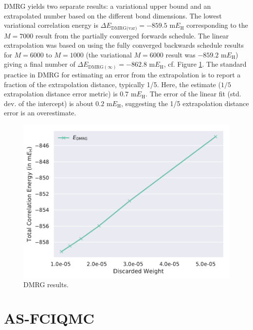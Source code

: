\documentclass[journal=jcp,manuscript=suppinfo]{achemso}
\begin{document}
DMRG yields two separate results: a variational upper bound and an extrapolated number based on the different bond dimensions.
The lowest variational correlation energy is $\Delta E_{\text{DMRG(var)}} = -859.5$ m$E_{\text{H}}$ corresponding to the 
  $M=7000$ result from the partially converged forwards schedule. The linear extrapolation was based on using the fully converged backwards schedule results for $M=6000$ to {\color{red}$M=1000$} (the
variational $M=6000$ result was {\color{red} $-859.2$ m$E_{\text{H}}$}) giving a final number of
$\Delta E_{\text{DMRG}(\infty)} = -862.8$ m$E_{\text{H}}$, cf. Figure \ref{dmrg_SI_fig}.
The standard practice in DMRG for estimating an error from the extrapolation is to report a fraction of the extrapolation distance, typically 1/5.
Here, the estimate ($1/5$ extrapolation distance error metric) is $0.7$ m$E_{\text{H}}$. The error of the linear fit (std. dev. of the intercept) is about $0.2$ m$E_{\text{H}}$, suggesting the 1/5 extrapolation distance error is an overestimate.
%
\begin{figure}[ht!]
\begin{center}
\includegraphics[scale=0.75]{figures/dmrg/dmrg.pdf}
\caption{DMRG results.}
\label{dmrg_SI_fig}
\end{center}
\end{figure}
%

\section{AS-FCIQMC}\label{as_fciqmc_SI_sect}
\end{document}
